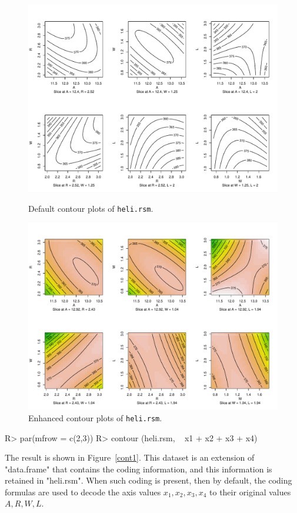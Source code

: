 \documentclass[article,nojss]{jss}
\begin{document}
\begin{figure}
\begin{center}
\includegraphics[width=.95\linewidth, viewport=0 10 560 396, clip]{rsm-plots-cont1.pdf}
\end{center}
\vspace{-26pt}
\caption{Default contour plots of \texttt{heli.rsm}.}\label{cont1}
\begin{center}
\includegraphics[width=.95\linewidth, viewport=0 10 560 422, clip]{rsm-plots-cont2.pdf}
\end{center}
\vspace{-26pt}
\caption{Enhanced contour plots of \texttt{heli.rsm}.}\label{cont2}
\end{figure}
\begin{Schunk}
\begin{Sinput}
R> par(mfrow = c(2,3))
R> contour (heli.rsm, ~ x1 + x2 + x3 + x4)
\end{Sinput}
\end{Schunk}
The result is shown in Figure~\ref{cont1}.  This dataset is an extension of "data.frame" that contains the coding information, and this information is retained in "heli.rsm".  When such coding is present, then by default, the coding formulas are used to decode the axis values $x_1,x_2,x_3,x_4$ to their original values $A,R,W,L$.
\end{document}
